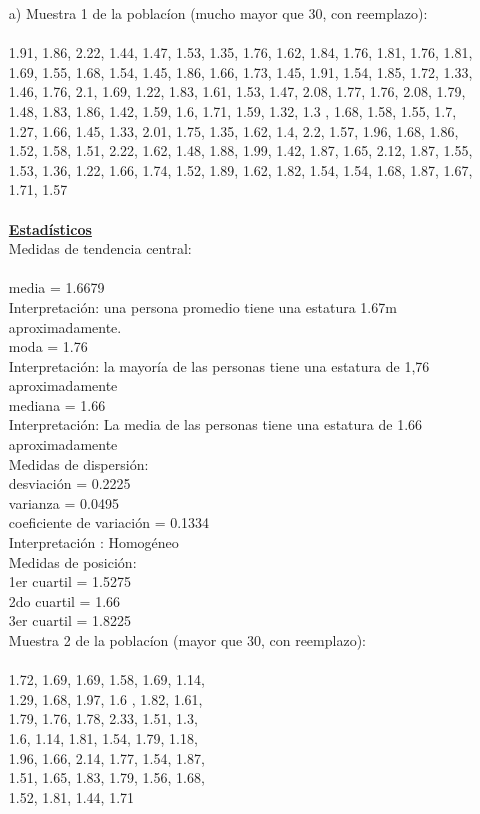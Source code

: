 \documentclass[a4paper,12pt]{article}
\begin{document}
\begin{enumerate}
    \item[a)] Muestra 1 de la poblac\'ion (mucho mayor que 30, con reemplazo): \\\\
1.91,   1.86,   2.22,   1.44,	1.47,   1.53,
1.35,	1.76,	1.62,	1.84,   1.76,	1.81,
1.76,	1.81,	1.69,	1.55,   1.68,	1.54,
1.45,	1.86,	1.66,	1.73,   1.45,	1.91,
1.54,	1.85,	1.72,	1.33,   1.46,	1.76,
2.1,    1.69,	1.22,	1.83,   1.61,	1.53,
1.47,	2.08,	1.77,	1.76,   2.08,	1.79,
1.48,	1.83,	1.86,	1.42,   1.59,	1.6,
1.71,	1.59,	1.32,	1.3	,   1.68,	1.58,
1.55,	1.7,    1.27,	1.66,   1.45,	1.33,
2.01,	1.75,	1.35,	1.62,   1.4,    2.2,
1.57,	1.96,	1.68,	1.86,   1.52,	1.58,
1.51,	2.22,	1.62,	1.48,   1.88,	1.99,
1.42,	1.87,	1.65,	2.12,   1.87,	1.55,
1.53,	1.36,	1.22,	1.66,   1.74,	1.52,
1.89,	1.62,	1.82,	1.54,   1.54,	1.68,
1.87,	1.67,	1.71,	1.57\\\\

\newpage
\textbf{\underline{Estad\'isticos}} \\

Medidas de tendencia central:\\\\
media = 1.6679\\
Interpretaci\'on: una persona promedio tiene una estatura 1.67m aproximadamente.\\
moda = 1.76\\
Interpretaci\'on: la mayor\'ia de las personas tiene una estatura de 1,76 aproximadamente\\
mediana = 1.66\\
Interpretaci\'on: La media de las personas tiene una estatura de 1.66 aproximadamente\\

Medidas de dispersi\'on:\\
desviaci\'on = 0.2225\\
varianza = 0.0495\\
coeficiente de variaci\'on = 0.1334\\
Interpretaci\'on : Homog\'eneo\\

Medidas de posici\'on:\\
1er cuartil = 1.5275\\
2do cuartil = 1.66\\
3er cuartil = 1.8225\\

Muestra 2 de la poblac\'ion (mayor que 30, con reemplazo): \\\\
1.72,	1.69,	1.69,	1.58,	1.69,	1.14,\\
1.29,	1.68,	1.97,	1.6	,   1.82,	1.61,\\
1.79,	1.76,	1.78,	2.33,	1.51,	1.3,\\
1.6,    1.14,	1.81,	1.54,	1.79,	1.18,\\
1.96,	1.66,	2.14,	1.77,	1.54,	1.87,\\
1.51,	1.65,	1.83,	1.79,	1.56,	1.68,\\
1.52,	1.81,	1.44,	1.71\\


\end{enumerate}
\end{document}
